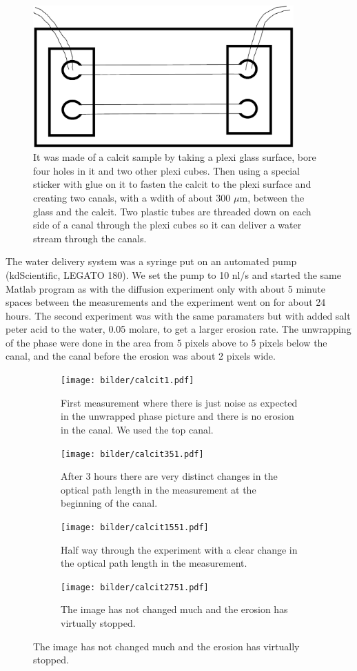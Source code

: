 \begin {figure}[ht!]
\includegraphics [width=10cm]{bilder/calcitsample.pdf}
\caption {%
It was made of a calcit sample by taking a plexi glass surface, bore four holes
in it and two other plexi cubes. Then using a special sticker with glue on it to
fasten the calcit to the plexi surface and creating two canals, with a wdith of about
300 $\mu$m, between the glass and the calcit. Two plastic tubes are threaded down 
on each side of a canal through the plexi cubes so it can deliver a water stream 
through the canals.}
\label {calsketch}
\end {figure}

The water delivery system was a syringe put on an automated pump 
(kdScientific, LEGATO 180). 
We set the pump to 10 nl/s and started the same Matlab program as with the diffusion
experiment only with about 5 minute spaces between the measurements and the experiment
went on for about 24 hours. The second experiment was with the same paramaters but with 
added salt peter acid to the water, 0.05 molare, to get a larger erosion rate. The unwrapping of
the phase were done in the area from 5 pixels above to 5 pixels below the canal, 
and the canal before the erosion was about 2 pixels wide.
\begin {figure}[ht!]
\hspace* {-1.5cm}
\begin {subfigure}[h]{0.35\textwidth}
\texttt{[image: bilder/calcit1.pdf]}
\caption {First measurement where there is just noise as expected in the
unwrapped phase picture and there is no erosion in the canal. We used the top
canal.}
\label {cal1}
\end {subfigure}
\hfill
\begin {subfigure}[h]{0.35\textwidth}
\texttt{[image: bilder/calcit351.pdf]}
\caption {After 3 hours there are very distinct changes in the optical path length
in the measurement at the beginning of the canal.}
\label {cal2}
\end {subfigure}

\hspace* {-1.5cm}
\begin {subfigure}[h]{0.35\textwidth}
\texttt{[image: bilder/calcit1551.pdf]}
\caption {Half way through the experiment with a clear change in the optical path length
in the measurement.}
\label {cal3}
\end {subfigure}
\hfill
\begin {subfigure}[h]{0.35\textwidth}
\texttt{[image: bilder/calcit2751.pdf]}
\caption {The image has not changed much and the erosion has virtually stopped.}
\label {cal4}
\end {subfigure}
\end {figure}
\quad

